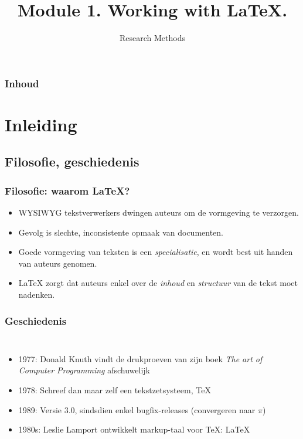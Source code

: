 \documentclass[aspectratio=169]{beamer}
\title{Module 1. Working with \LaTeX.}
\subtitle{Research Methods}
\author{\lecturers}   %
\date{\academicyear}
\begin{document}
\begin{frame}
  \maketitle
\end{frame}

\begin{frame}
  \frametitle{Inhoud}

  \tableofcontents
\end{frame}

\section{Inleiding}

\subsection{Filosofie, geschiedenis}

\begin{frame}
  \frametitle{Filosofie: waarom {\LaTeX}?}

  \begin{itemize}
    \item<+-> WYSIWYG tekstverwerkers dwingen auteurs om de vormgeving te verzorgen.
    \item<+-> Gevolg is slechte, inconsistente opmaak van documenten.
    \item<+-> Goede vormgeving van teksten is een \textit{specialisatie}, en wordt best
    uit handen van auteurs genomen.
    \item<+-> {\LaTeX} zorgt dat auteurs enkel over de \textit{inhoud} en \textit{structuur} van de tekst moet nadenken.
  \end{itemize}
\end{frame}

\begin{frame}[plain]
  \frametitle{Geschiedenis}

  \begin{columns}[c]

    \begin{itemize}
      \item<+-> 1977: Donald Knuth vindt de drukproeven van zijn boek \textit{The art of Computer Programming} afschuwelijk
      \item<+-> 1978: Schreef dan maar zelf een tekstzetsysteem, {\TeX}
      \item<+-> 1989: Versie 3.0, sindsdien enkel bugfix-releases (convergeren naar \(\pi\))
      \item<+-> 1980s: Leslie Lamport ontwikkelt markup-taal voor {\TeX}: {\LaTeX}
    \end{itemize}

    \begin{center}
    \end{center}

  \end{columns}
\end{frame}
\end{document}
